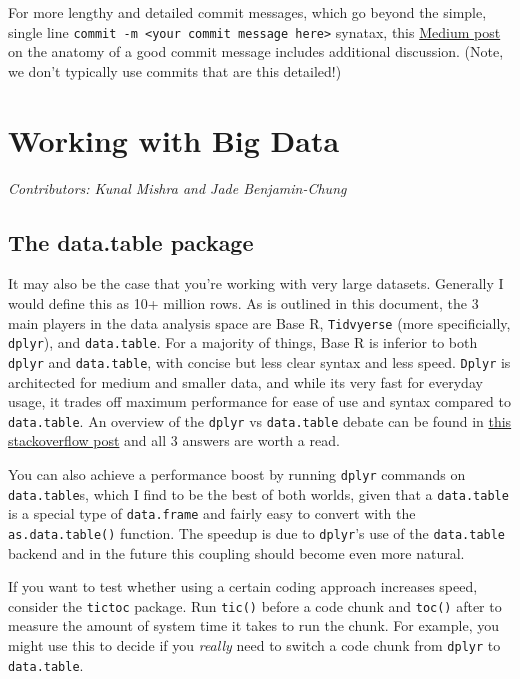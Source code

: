 \documentclass[]{book}
\begin{document}
For more lengthy and detailed commit messages, which go beyond the simple, single line \texttt{commit\ -m\ \textless{}your\ commit\ message\ here\textgreater{}} synatax, this \href{https://medium.com/@andrewhowdencom/anatomy-of-a-good-commit-message-acd9c4490437}{Medium post} on the anatomy of a good commit message includes additional discussion. (Note, we don't typically use commits that are this detailed!)

\hypertarget{bigdata}{%
\chapter{Working with Big Data}\label{bigdata}}

\emph{Contributors: Kunal Mishra and Jade Benjamin-Chung}

\hypertarget{the-data.table-package}{%
\section{The data.table package}\label{the-data.table-package}}

It may also be the case that you're working with very large datasets. Generally I would define this as 10+ million rows. As is outlined in this document, the 3 main players in the data analysis space are Base R, \texttt{Tidvyerse} (more specificially, \texttt{dplyr}), and \texttt{data.table}. For a majority of things, Base R is inferior to both \texttt{dplyr} and \texttt{data.table}, with concise but less clear syntax and less speed. \texttt{Dplyr} is architected for medium and smaller data, and while its very fast for everyday usage, it trades off maximum performance for ease of use and syntax compared to \texttt{data.table}. An overview of the \texttt{dplyr} vs \texttt{data.table} debate can be found in \href{https://stackoverflow.com/questions/21435339/data-table-vs-dplyr-can-one-do-something-well-the-other-cant-or-does-poorly/27840349\#27840349}{this stackoverflow post} and all 3 answers are worth a read.

You can also achieve a performance boost by running \texttt{dplyr} commands on \texttt{data.table}s, which I find to be the best of both worlds, given that a \texttt{data.table} is a special type of \texttt{data.frame} and fairly easy to convert with the \texttt{as.data.table()} function. The speedup is due to \texttt{dplyr}'s use of the \texttt{data.table} backend and in the future this coupling should become even more natural.

If you want to test whether using a certain coding approach increases speed, consider the \texttt{tictoc} package. Run \texttt{tic()} before a code chunk and \texttt{toc()} after to measure the amount of system time it takes to run the chunk. For example, you might use this to decide if you \emph{really} need to switch a code chunk from \texttt{dplyr} to \texttt{data.table}.
\end{document}
